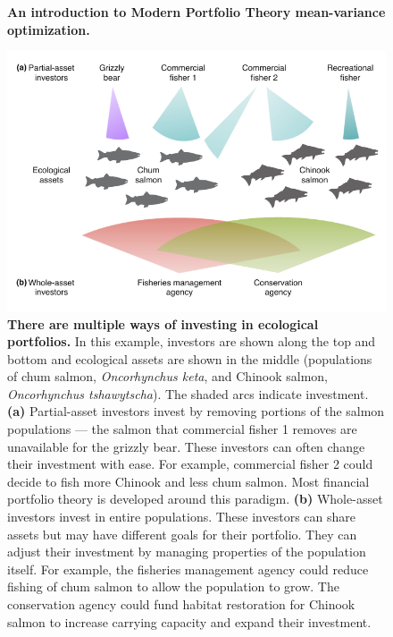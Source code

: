 \begin{figure}[htbp]
\centering
\caption{
  \textbf{An introduction to Modern Portfolio Theory mean-variance optimization.}
}
\label{fig:mpt}
\end{figure}

\clearpage

\begin{figure}[htbp]
\centering \includegraphics[width=5in]{salmon-portfolios.pdf} \caption{\textbf{There
  are multiple ways of investing in ecological portfolios.} In this example,
  investors are shown along the top and bottom and ecological assets are shown
  in the middle (populations of chum salmon, \textit{Oncorhynchus keta}, and
  Chinook salmon, \textit{Oncorhynchus tshawytscha}). The shaded arcs indicate
  investment. \textbf{(a)} Partial-asset investors invest by removing portions
  of the salmon populations --- the salmon that commercial fisher 1 removes are
  unavailable for the grizzly bear. These investors can often change their
  investment with ease. For example, commercial fisher 2 could decide to fish
  more Chinook and less chum salmon. Most financial portfolio theory is
  developed around this paradigm. \textbf{(b)} Whole-asset investors invest in
  entire populations. These investors can share assets but may have different
  goals for their portfolio. They can adjust their investment by managing
  properties of the population itself. For example, the fisheries management
  agency could reduce fishing of chum salmon to allow the population to grow.
  The conservation agency could fund habitat restoration for Chinook salmon to
  increase carrying capacity and expand their investment.}
\label{fig:salmonport}
\end{figure}


